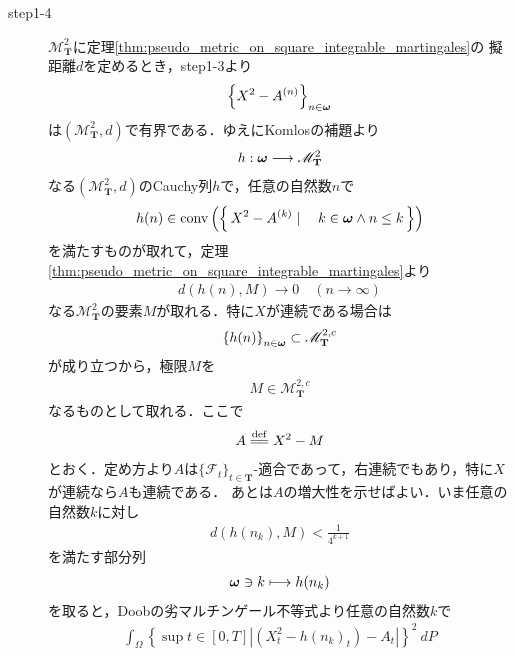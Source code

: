\begin{sketch}
\begin{description}
			\item[step1-4]
				$\mathscr{M}^2_{\mathbf{T}}$に定理\ref{thm:pseudo_metric_on_square_integrable_martingales}の
				擬距離$d$を定めるとき，step1-3より
				\begin{align}
					\left\{X^2 - A^{(n)}\right\}_{n \in {\boldsymbol \omega}}
				\end{align}
				は$\left(\mathscr{M}^2_{\mathbf{T}},d\right)$で有界である．ゆえにKomlosの補題より
				\begin{align}
					h:{\boldsymbol \omega} \longrightarrow \mathscr{M}^2_{\mathbf{T}}
				\end{align}
				なる$\left(\mathscr{M}^2_{\mathbf{T}},d\right)$のCauchy列$h$で，任意の自然数$n$で
				\begin{align}
					h(n) \in \operatorname*{conv} \left(\left\{\, X^2-A^{(k)} \mid \quad k \in {\boldsymbol \omega} \wedge n \leq k\, \right\}\right)
					\label{fom:thm_decomposition_of_square_integrable_martingales_3}
				\end{align}
				を満たすものが取れて，定理\ref{thm:pseudo_metric_on_square_integrable_martingales}より
				\begin{align}
					d(h(n),M) \longrightarrow 0\quad (n \longrightarrow \infty)
				\end{align}
				なる$\mathscr{M}^2_{\mathbf{T}}$の要素$M$が取れる．特に$X$が連続である場合は
				\begin{align}
					\left\{h(n)\right\}_{n \in {\boldsymbol \omega}} \subset \mathscr{M}^{2,c}_{\mathbf{T}}
				\end{align}
				が成り立つから，極限$M$を
				\begin{align}
					M \in \mathscr{M}^{2,c}_{\mathbf{T}}
				\end{align}
				なるものとして取れる．ここで
				\begin{align}
					A \defeq X^2 - M
				\end{align}
				とおく．定め方より$A$は$\{\mathscr{F}_t\}_{t \in \mathbf{T}}$-適合であって，右連続でもあり，特に$X$が連続なら$A$も連続である．
				あとは$A$の増大性を示せばよい．いま任意の自然数$k$に対し
				\begin{align}
					d(h(n_k),M) < \frac{1}{4^{k+1}}
				\end{align}
				を満たす部分列
				\begin{align}
					{\boldsymbol \omega} \ni k \longmapsto h(n_k)
				\end{align}
				を取ると，Doobの劣マルチンゲール不等式より任意の自然数$k$で
				\begin{align}
					\int_\Omega \left\{\sup{t \in [0,T]}{\left|\left(X^2_t - h(n_k)_t\right) - A_t\right|}\right\}^2\ dP

\end{align}
\end{description}
\end{sketch}
